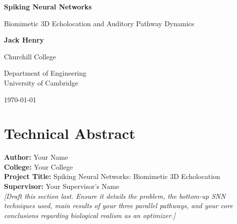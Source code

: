 \documentclass[12pt,a4paper]{report}
\begin{document}
\begin{titlepage}
    \centering
    \vspace*{2cm}
    {\Huge \bfseries Spiking Neural Networks\par}
    \vspace{1cm}
    {\Large Biomimetic 3D Echolocation and Auditory Pathway Dynamics \par}
    \vspace{2cm}
    {\large \textbf{Jack Henry} \par}
    {\large Churchill College \par}
    \vfill
    {\large Department of Engineering \\ University of Cambridge \par}
    \vspace{1cm}
    \vspace{1cm}
    {\large \today \par}
\end{titlepage}


\chapter*{Technical Abstract}

\noindent
\textbf{Author:} Your Name \\
\textbf{College:} Your College \\
\textbf{Project Title:} Spiking Neural Networks: Biomimetic 3D Echolocation \\
\textbf{Supervisor:} Your Supervisor's Name \\

\noindent
\textit{[Draft this section last. Ensure it details the problem, the bottom-up SNN techniques used, main results of your three parallel pathways, and your core conclusions regarding biological realism as an optimizer.]}

\newpage
\tableofcontents
\newpage
\end{document}
